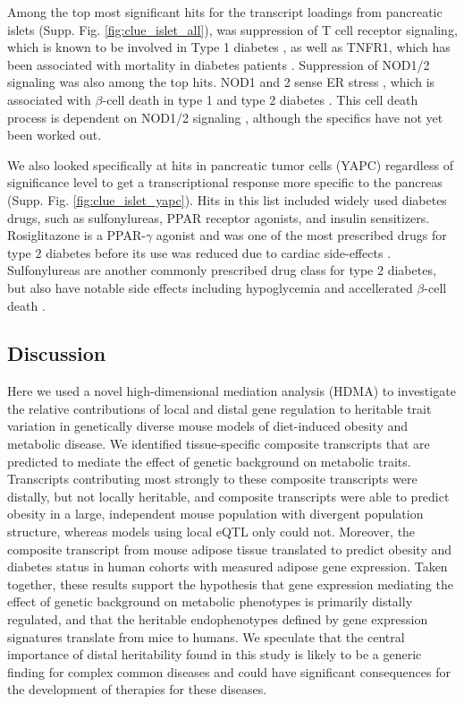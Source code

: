\documentclass[
]{article}
\begin{document}
Among the top most significant hits for the transcript loadings from
pancreatic islets (Supp. Fig. \ref{fig:clue_islet_all}), was suppression
of T cell receptor signaling, which is known to be involved in Type 1
diabetes \cite{pmid33603744}, as well as TNFR1, which has been
associated with mortality in diabetes patients \cite{pmid32281000}.
Suppression of NOD1/2 signaling was also among the top hits. NOD1 and 2
sense ER stress \cite{pmid27007849, pmid28823510}, which is associated
with \(\beta\)-cell death in type 1 and type 2 diabetes
\cite{pmid24520198}. This cell death process is dependent on NOD1/2
signaling \cite{pmid27007849}, although the specifics have not yet been
worked out.

We also looked specifically at hits in pancreatic tumor cells (YAPC)
regardless of significance level to get a transcriptional response more
specific to the pancreas (Supp. Fig. \ref{fig:clue_islet_yapc}). Hits in
this list included widely used diabetes drugs, such as sulfonylureas,
PPAR receptor agonists, and insulin sensitizers. Rosiglitazone is a
PPAR-\(\gamma\) agonist and was one of the most prescribed drugs for
type 2 diabetes before its use was reduced due to cardiac side-effects
\cite{pmid21190462}. Sulfonylureas are another commonly prescribed drug
class for type 2 diabetes, but also have notable side effects including
hypoglycemia and accellerated \(\beta\)-cell death \cite{pmid16631807}.

\subsection{Discussion}\label{discussion}

Here we used a novel high-dimensional mediation analysis (HDMA) to
investigate the relative contributions of local and distal gene
regulation to heritable trait variation in genetically diverse mouse
models of diet-induced obesity and metabolic disease. We identified
tissue-specific composite transcripts that are predicted to mediate the
effect of genetic background on metabolic traits. Transcripts
contributing most strongly to these composite transcripts were distally,
but not locally heritable, and composite transcripts were able to
predict obesity in a large, independent mouse population with divergent
population structure, whereas models using local eQTL only could not.
Moreover, the composite transcript from mouse adipose tissue translated
to predict obesity and diabetes status in human cohorts with measured
adipose gene expression. Taken together, these results support the
hypothesis that gene expression mediating the effect of genetic
background on metabolic phenotypes is primarily distally regulated, and
that the heritable endophenotypes defined by gene expression signatures
translate from mice to humans. We speculate that the central importance
of distal heritability found in this study is likely to be a generic
finding for complex common diseases and could have significant
consequences for the development of therapies for these diseases.
\end{document}
